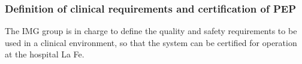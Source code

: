 %
%
%
%
\subsubsection*{Definition of clinical requirements and certification of PEP}
The IMG group is in charge to define the quality and safety requirements to be used in a clinical environment, so that the system can be certified for operation at  the hospital La Fe.


